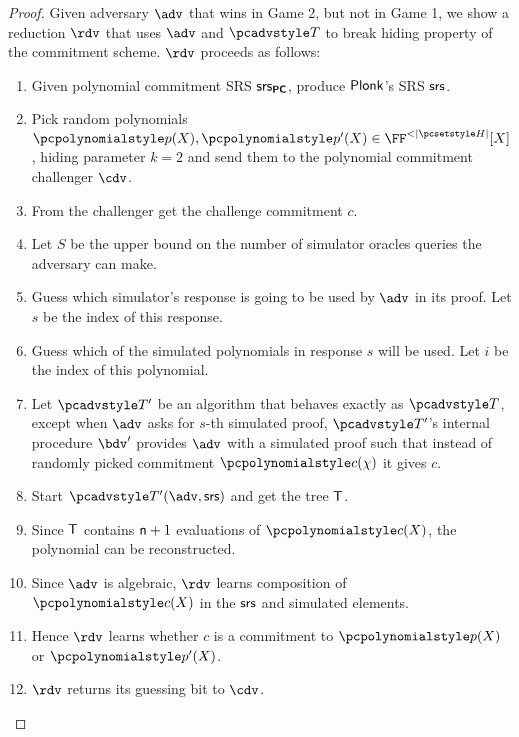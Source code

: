 \documentclass[runningheads,11pt]{llncs}
\begin{document}
\begin{proof}
   Given adversary $\adv$ that wins in Game 2, but not
  in Game 1, we show a reduction $\rdv$ that uses $\adv$ and $\tdv$ to break
  hiding property
  of the commitment scheme. $\rdv$ proceeds as follows:
  \begin{enumerate}
  \item Given polynomial commitment SRS $\mathsf{srs}_{\bm{\mathsf{PC}}}$, produce $\textnormal{\textsf{Plonk}}$'s SRS
    $\mathsf{srs}$.
  \item Pick random polynomials $\p{p} (X), \p{p'} (X) \in \FF^{< |\HHH|} [X]$,
    hiding parameter $k = 2$ and send them to the polynomial commitment
    challenger $\cdv$.
  \item From the challenger get the challenge commitment $c$.
  \item Let $S$ be the upper bound on the number of simulator oracles queries
    the adversary can make. %
  \item Guess which simulator's response is going to be used by $\adv$ in its
    proof. Let $s$ be the index of this response.
  \item Guess which of the simulated polynomials in response $s$ will be
    used. Let $i$ be the index of this polynomial.
  \item Let $\tdv'$ be an algorithm that behaves exactly as $\tdv$, except when
    $\adv$ asks for $s$-th simulated proof, $\tdv'$'s internal procedure $\bdv'$
    provides $\adv$ with a simulated proof such that instead of randomly picked
    commitment $\p{c} (\chi)$ it gives $c$.
  \item Start $\tdv'(\adv, \srs)$ and get the tree $\mathsf{T}$.
  \item Since $\mathsf{T}$ contains $\mathsf{n} + 1$ evaluations of $\p{c} (X)$, the
    polynomial can be reconstructed. 
  \item Since $\adv$ is algebraic, $\rdv$ learns composition of $\p{c} (X)$ in
    the $\mathsf{srs}$ and simulated elements. 
  \item Hence $\rdv$ learns whether $c$ is a commitment to $\p{p} (X)$ or
    $\p{p'} (X)$.
  \item $\rdv$ returns its guessing bit to $\cdv$.
  \end{enumerate}


\end{proof}
\end{document}
